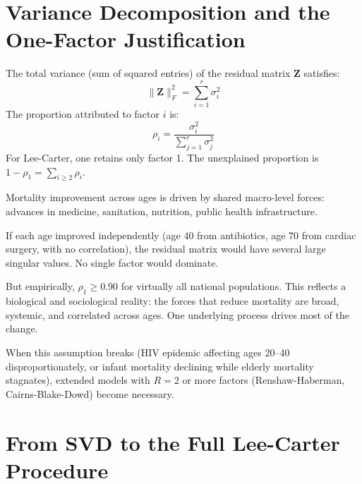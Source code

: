 \documentclass[11pt,a4paper]{article}
\begin{document}
\section{Variance Decomposition and the One-Factor Justification}

\begin{formaldef}
The total variance (sum of squared entries) of the residual matrix $\bm{Z}$ satisfies:
\[
\|\bm{Z}\|_F^2 = \sum_{i=1}^{r} \sigma_i^2
\]
The proportion attributed to factor $i$ is:
\[
\rho_i = \frac{\sigma_i^2}{\sum_{j=1}^{r} \sigma_j^2}
\]
For Lee-Carter, one retains only factor 1. The unexplained proportion is $1 - \rho_1 = \sum_{i \geq 2} \rho_i$.
\end{formaldef}

\begin{intuition}
Mortality improvement across ages is driven by shared macro-level forces:
advances in medicine, sanitation, nutrition, public health infrastructure.

If each age improved independently (age 40 from antibiotics, age 70 from cardiac surgery,
with no correlation), the residual matrix would have several large singular values.
No single factor would dominate.

But empirically, $\rho_1 \geq 0.90$ for virtually all national populations. This reflects a
biological and sociological reality: the forces that reduce mortality are broad, systemic,
and correlated across ages. One underlying process drives most of the change.

When this assumption breaks (HIV epidemic affecting ages 20--40 disproportionately,
or infant mortality declining while elderly mortality stagnates), extended models with
$R = 2$ or more factors (Renshaw-Haberman, Cairns-Blake-Dowd) become necessary.
\end{intuition}

\section{From SVD to the Full Lee-Carter Procedure}
\end{document}
